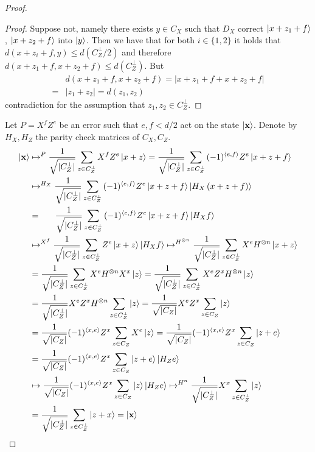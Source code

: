 \begin{proof}
\begin{claim}
    \begin{proof}
      Suppose not, namely there exists $y \in C_{X}$ such that $D_{X}$ correct $\ket{x+z_{1}+f}$, $\ket{x+z_{2}+f}$ into $\ket{y}$. Then we have that for both $i\in \{1,2\}$ it holds that  $d\left( x+z_{i} +f, y \right) \le d\left( C_{Z}^{\perp}/2 \right)$ and therefore $ d\left( x + z_{1} + f, x+z_{2} +f  \right) \le d\left( C_{Z}^{\perp} \right)$. But
      \begin{equation*}
        \begin{split}
            & d\left( x + z_{1} + f, x+z_{2} +f  \right) =  | x + z_{1} + f + x + z_{2} + f | \\
            =  & | z_{1} + z_{2} | = d\left( z_{1},z_{2} \right) 
        \end{split}
      \end{equation*}     
      contradiction for the assumption that $z_{1},z_{2} \in C_{Z}^{\perp}$.   
    \end{proof}
    \end{claim} 
    Let $P = X^{f}Z^{e}$ be an error such that $e, f < d/2$ act on the state $\ket{\mathbf{x}}$. Denote by $H_{X}, H_{Z}$ the parity check matrices of $C_{X},C_{Z}$. 
      \begin{equation*}
      \begin{split}
        \ket{\mathbf{x}} &  \mapsto^{P}   \frac{1}{\sqrt{|C_{Z}^{\perp}|}} \sum_{z \in C_{Z}^{\perp}}{ X^{f}Z^{e}\ket{ x + z }} = \frac{1}{\sqrt{|C_{Z}^{\perp}|}} \sum_{z \in C_{Z}^{\perp}}{ (-1)^{\braket{e,f} }Z^{e}\ket{ x + z + f}}\\
        & \mapsto^{H_{X}} \GZZZ{ (-1)^{\braket{e,f} }Z^{e}\ket{ x + z + f} \ket{ H_{X} \left(x + z + f\right) }  } \\ 
        & = \ \ \ \ \ \GZZZ{ (-1)^{\braket{e,f} }Z^{e}\ket{ x + z + f} \ket{ H_{X}f }  }\\
        & \mapsto^{X^{f}} \GZZZ{ Z^{e}\ket{ x + z} \ket{ H_{X}f }  }  \mapsto^{H^{\otimes n}} \GZZZ{  X^{e}H^{\otimes n}\ket{ x + z} } \\
        & = \GZZZ{  X^{e}H^{\otimes n} X^{x} \ket{ z} }  = \GZZZ{  X^{e} Z^{x} H^{\otimes n} \ket{ z} } \\
        & = \GZZZW{ \ket{ z} }{X^{e} Z^{x} H^{\otimes n} }  =  \GXXXW{  \ket{ z} }{ X^{e} Z^{x} } \\
        & =  \GXXXW{   X^{e}\ket{ z} }{ (-1)^{\braket{x,e}} Z^{x}}  =  \GXXXW{   \ket{ z + e} }{ (-1)^{\braket{x,e}} Z^{x}} \\
        & =  \GXXXW{   \ket{ z + e} \ket{ H_{Z}e }}{ (-1)^{\braket{x,e}} Z^{x}} \\
        & \mapsto  \GXXXW{   \ket{ z } \ket{ H_{Z}e }}{ (-1)^{\braket{x,e}} Z^{x}} \mapsto^{H^{n}}  \GZZZW{   \ket{ z }}{ X^{x}}\\ 
        & = \GZZZ{ \ket{z + x}} = \ket{\mathbf{x}}
      \end{split}
    \end{equation*}
  \end{proof}
  
